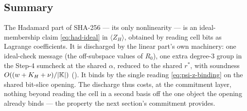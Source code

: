\subsection{Summary}
\label{sec:had-summary}

The Hadamard part of SHA-256 --- its only nonlinearity --- is an
ideal-membership claim \eqref{eq:had-ideal} in $\langle Z_H\rangle$, obtained by
reading cell bits as Lagrange coefficients. It is discharged by the linear
part's own machinery: one ideal-check message (the off-subspace values of
$R_0$), one extra degree-$3$ group in the Step-4 sumcheck at the shared $\alpha$,
reduced to the shared $r^*$, with soundness $O((w + K_H + \nu)/|\mathbb{K}|)$
(). It binds by the single reading
\eqref{eq:psi-z-binding} on the shared bit-slice opening. The discharge thus
costs, at the commitment layer, nothing beyond reading the cell in a second
basis off the one object the opening already binds --- the property the next
section's commitment provides.
